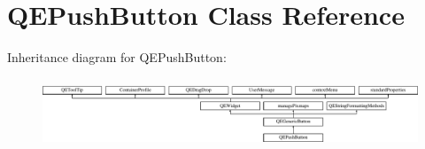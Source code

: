 \hypertarget{classQEPushButton}{
\section{QEPushButton Class Reference}
\label{classQEPushButton}
}
Inheritance diagram for QEPushButton:\begin{figure}[H]
\begin{center}
\leavevmode
\includegraphics[height=2.097378cm]{classQEPushButton}
\end{center}
\end{figure}
